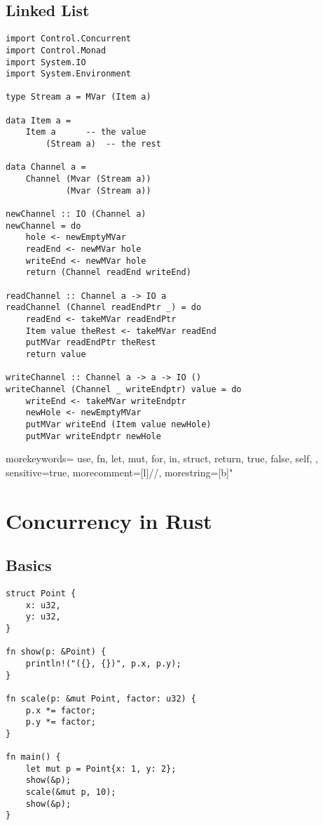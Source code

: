 \documentclass[twocolumn,landscape,10pt]{article}
\theoremstyle{definition}
\begin{document}
\subsection{Linked List}

\begin{lstlisting}[Haskell]
import Control.Concurrent
import Control.Monad
import System.IO
import System.Environment

type Stream a = MVar (Item a)

data Item a =
    Item a      -- the value
        (Stream a)  -- the rest

data Channel a =
    Channel (Mvar (Stream a))
            (Mvar (Stream a))

newChannel :: IO (Channel a)
newChannel = do
    hole <- newEmptyMVar
    readEnd <- newMVar hole
    writeEnd <- newMVar hole
    return (Channel readEnd writeEnd)

readChannel :: Channel a -> IO a
readChannel (Channel readEndPtr _) = do
    readEnd <- takeMVar readEndPtr
    Item value theRest <- takeMVar readEnd
    putMVar readEndPtr theRest
    return value

writeChannel :: Channel a -> a -> IO ()
writeChannel (Channel _ writeEndptr) value = do
    writeEnd <- takeMVar writeEndptr
    newHole <- newEmptyMVar
    putMVar writeEnd (Item value newHole)
    putMVar writeEndptr newHole
\end{lstlisting} 

 {
  morekeywords={
      use, fn, let, mut, for, in, struct,
      return, true, false, self,
  },
  sensitive=true,
  morecomment=[l]{//},
  morestring=[b]"
}

\newpage
\section{Concurrency in Rust}

\subsection{Basics}
\begin{lstlisting}[Rust]
struct Point {
    x: u32,
    y: u32,
}

fn show(p: &Point) {
    println!("({}, {})", p.x, p.y);
}

fn scale(p: &mut Point, factor: u32) {
    p.x *= factor;
    p.y *= factor;
}

fn main() {
    let mut p = Point{x: 1, y: 2};
    show(&p);
    scale(&mut p, 10);
    show(&p);
}
\end{lstlisting} 
\end{document}
